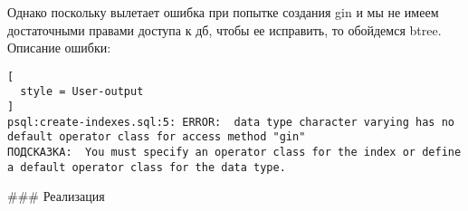 Однако поскольку вылетает ошибка при попытке создания gin и мы не имеем достаточными правами доступа к дб, чтобы ее исправить, то обойдемся btree. Описание ошибки:

\begin{lstlisting}[
  style = User-output
]
psql:create-indexes.sql:5: ERROR:  data type character varying has no default operator class for access method "gin"
ПОДСКАЗКА:  You must specify an operator class for the index or define a default operator class for the data type.
\end{lstlisting}

\begin{markdown}
### Реализация
\end{markdown}


